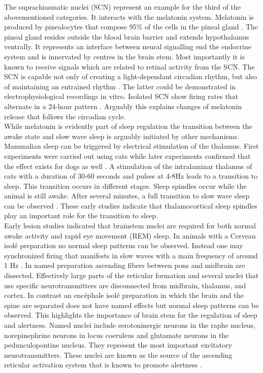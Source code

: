The suprachiasmatic nuclei (SCN) represent an example for the third of the abovementioned categories. It interacts with the melatonin system. Melatonin is produced by pinealocytes that compose 95\% of the cells in the pineal gland \parencite{aulinas2019physiology}. The pineal gland resides outside the blood brain barrier and extends hypothalamus ventrally. It represents an interface between neural signalling end the endocrine system and is innervated by centres in the brain stem. Most importantly it is known to receive signals which are related to retinal activity from the SCN. The SCN is capable not only of creating a light-dependant circadian rhythm, but also of maintaining an entrained rhythm \parencite{koella1984organization}. The latter could be demonstrated in electrophysiological recordings in vitro. Isolated SCN show firing rates that alternate in a 24-hour pattern \parencite{de2011melatonergic}. Arguably this explains changes of melatonin release that follows the circadian cycle.\\
While melatonin is evidently part of sleep regulation the transition between the awake state and slow wave sleep is arguably initiated by other mechanisms. Mammalian sleep can be triggered by electrical stimulation of the thalamus. First experiments were carried out using cats while later experiments confirmed that the effect exists for dogs as well \parencite{akert1951sleep, akimoto1956sleep}. A stimulation of the intralaminar thalamus of cats with a duration of 30-60 seconds and pulses at 4-8Hz leads to a transition to sleep. This transition occurs in different stages. Sleep spindles occur while the animal is still awake. After several minutes, a full transition to slow wave sleep can be observed \parencite{akert1951sleep}. These early studies indicate that thalamocortical sleep spindles play an important role for the transition to sleep.\\
Early lesion studies indicated that brainstem nuclei are required for both normal awake activity and rapid eye movement (REM) sleep. In animals with a Cerveau isolé preparation no normal sleep patterns can be observed. Instead one may synchronized firing that manifests in slow waves with a main frequency of around 1 Hz \parencite{kawamura1968hippocampal}. In named preparation ascending fibers between pons and midbrain are dissected. Effectively large parts of the reticular formation and several nuclei that use specific neurotransmitters are disconnected from midbrain, thalamus, and cortex. In contrast an encéphale isolé preparation in which the brain and the spine are separated does not have named effects but normal sleep patterns can be observed. This highlights the importance of brain stem for the regulation of sleep and alertness. Named nuclei include serotoninergic neurons in the raphe nucleus, norepinephrine neurons in locus coeruleus and glutamate neurons in the pedunculopontine nucleus. They represent the most important excitatory neurotransmitters. These nuclei are known as the source of the ascending reticular activation system that is known to promote alertness \parencite{brown2012control}.\\

